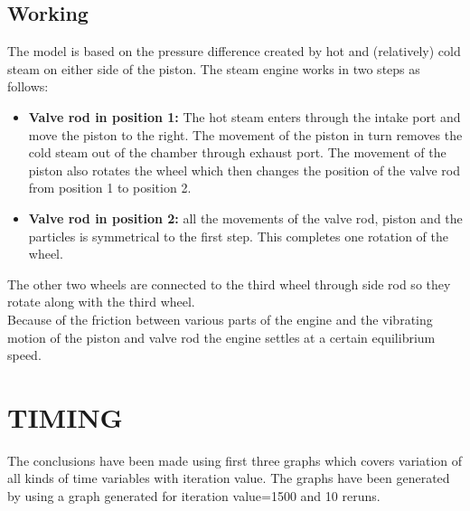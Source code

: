 \documentclass[11pt]{article}
\begin{document}
\subsection{Working}
The model is based on the pressure difference created by hot and (relatively) cold steam on either side of the piston. The steam engine works in two steps as follows\cite{wiki}:
\begin{itemize}
\item \textbf{Valve rod in position 1: } The hot steam enters through the intake port and move the piston to the right. The movement of the piston in turn removes the cold steam out of the chamber through exhaust port. The movement of the piston also rotates the wheel which then changes the position of the valve rod from position 1 to position 2.
\item \textbf{Valve rod in position 2: } all the movements of the valve rod, piston and the particles is symmetrical to the first step. This completes one rotation of the wheel.
\end{itemize}
The other two wheels are connected to the third wheel through side rod so they rotate along with the third wheel.\\
Because of the friction between various parts of the engine and the vibrating motion of the piston and valve rod the engine settles at a certain equilibrium speed.

\section{TIMING}
The conclusions have been made using first three graphs which covers variation of all kinds of time variables with iteration value.
The graphs have been generated by using a graph generated for iteration value=1500 and 10 reruns.
\end{document}
